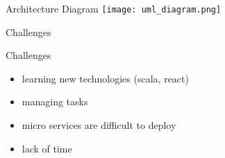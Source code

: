 \documentclass{beamer}
\begin{document}
\begin{frame}{Architecture Diagram}
\texttt{[image: uml\_diagram.png]}
\end{frame}

\begin{frame}
\Huge Challenges
\end{frame}

\begin{frame}{Challenges}
\begin{itemize}
\item learning new technologies (scala, react)
\item managing tasks
\item micro services are difficult to deploy
\item lack of time
\end{itemize}
\end{frame}
\end{document}
